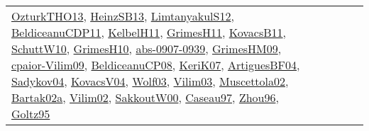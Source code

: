 {\begin{longtable}{lp{3cm}>{\raggedright}p{6cm}>{\raggedright}p{6cm}p{8cm}}
\href{articles/OzturkTHO13.pdf}{OzturkTHO13}\cite{OzturkTHO13}, \href{articles/HeinzSB13.pdf}{HeinzSB13}\cite{HeinzSB13}, \href{articles/LimtanyakulS12.pdf}{LimtanyakulS12}\cite{LimtanyakulS12}, \href{articles/BeldiceanuCDP11.pdf}{BeldiceanuCDP11}\cite{BeldiceanuCDP11}, \href{articles/KelbelH11.pdf}{KelbelH11}\cite{KelbelH11}, \href{papers/GrimesH11.pdf}{GrimesH11}\cite{GrimesH11}, \href{articles/KovacsB11.pdf}{KovacsB11}\cite{KovacsB11}, \href{papers/SchuttW10.pdf}{SchuttW10}\cite{SchuttW10}, \href{papers/GrimesH10.pdf}{GrimesH10}\cite{GrimesH10}, \href{articles/abs-0907-0939.pdf}{abs-0907-0939}\cite{abs-0907-0939}, \href{papers/GrimesHM09.pdf}{GrimesHM09}\cite{GrimesHM09}, \href{papers/cpaior-Vilim09.pdf}{cpaior-Vilim09}\cite{cpaior-Vilim09}, \href{papers/BeldiceanuCP08.pdf}{BeldiceanuCP08}\cite{BeldiceanuCP08}, \href{papers/KeriK07.pdf}{KeriK07}\cite{KeriK07}, \href{papers/ArtiguesBF04.pdf}{ArtiguesBF04}\cite{ArtiguesBF04}, \href{papers/Sadykov04.pdf}{Sadykov04}\cite{Sadykov04}, \href{papers/KovacsV04.pdf}{KovacsV04}\cite{KovacsV04}, \href{papers/Wolf03.pdf}{Wolf03}\cite{Wolf03}, \href{papers/Vilim03.pdf}{Vilim03}\cite{Vilim03}, \href{papers/Muscettola02.pdf}{Muscettola02}\cite{Muscettola02}, \href{papers/Bartak02a.pdf}{Bartak02a}\cite{Bartak02a}, \href{papers/Vilim02.pdf}{Vilim02}\cite{Vilim02}, \href{articles/SakkoutW00.pdf}{SakkoutW00}\cite{SakkoutW00}, \href{papers/Caseau97.pdf}{Caseau97}\cite{Caseau97}, \href{papers/Zhou96.pdf}{Zhou96}\cite{Zhou96}, \href{papers/Goltz95.pdf}{Goltz95}\cite{Goltz95}\\

\end{longtable}}
